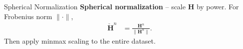 \documentclass{beamer}
\newcommand{\fignocap}[2]{
	\begin{figure}[!hbtp]
	    \centering
		\texttt{[image: \#2]}
	\end{figure}
}
\begin{document}


  \begin{frame}{Spherical Normalization}
    \textbf{Spherical normalization} -- scale $\mathbf H$ by power. For Frobenius norm $\|\cdot\|$,
    \begin{align}
      \mathbf{\check H}^n &= \frac{\mathbf H^n}{\|\mathbf H^n\|}. \label{eq:sph-intro}
    \end{align}
    Then apply minmax scaling to the entire dataset.
  \end{frame}

\end{document}
